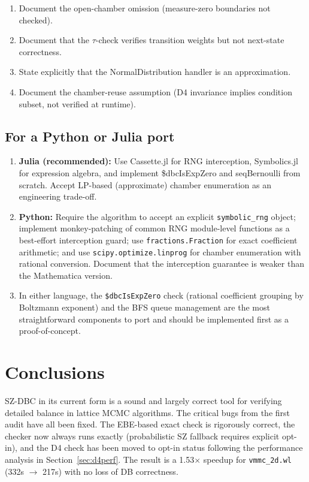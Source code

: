\documentclass[12pt,a4paper]{article}
\theoremstyle{critical}
\theoremstyle{remark}
\theoremstyle{verified}
\begin{document}
\begin{enumerate}
\item Document the open-chamber omission (measure-zero boundaries not checked).
\item Document that the $\tau$-check verifies transition weights but not next-state
  correctness.
\item State explicitly that the NormalDistribution handler is an approximation.
\item Document the chamber-reuse assumption (D4 invariance implies condition
  subset, not verified at runtime).
\end{enumerate}

\subsection{For a Python or Julia port}

\begin{enumerate}
\item \textbf{Julia (recommended):} Use Cassette.jl for RNG interception,
  Symbolics.jl for expression algebra, and implement \$dbcIsExpZero and
  seqBernoulli from scratch.  Accept LP-based (approximate) chamber enumeration
  as an engineering trade-off.
\item \textbf{Python:} Require the algorithm to accept an explicit
  \texttt{symbolic\_rng} object; implement monkey-patching of common RNG
  module-level functions as a best-effort interception guard; use
  \texttt{fractions.Fraction} for exact coefficient arithmetic; and use
  \texttt{scipy.optimize.linprog} for chamber enumeration with rational
  conversion.  Document that the interception guarantee is weaker than the
  Mathematica version.
\item In either language, the \texttt{\$dbcIsExpZero} check (rational
  coefficient grouping by Boltzmann exponent) and the BFS queue management are
  the most straightforward components to port and should be implemented first
  as a proof-of-concept.
\end{enumerate}

\section{Conclusions}

SZ-DBC in its current form is a sound and largely correct tool for verifying
detailed balance in lattice MCMC algorithms.  The critical bugs from the first
audit have all been fixed.  The EBE-based exact check is rigorously correct, the
checker now always runs exactly (probabilistic SZ fallback requires explicit
opt-in), and the D4 check has been moved to opt-in status following the
performance analysis in Section~\ref{sec:d4perf}.  The result is a 1.53$\times$
speedup for \texttt{vmmc\_2d.wl} (332s $\to$ 217s) with no loss of DB correctness.
\end{document}
